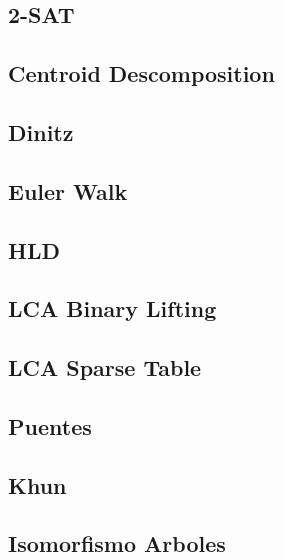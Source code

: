 \subsection{   2-SAT}
\raggedbottom
\hrulefill
\subsection{   Centroid Descomposition}
\raggedbottom
\hrulefill
\subsection{   Dinitz}
\raggedbottom
\hrulefill
\subsection{   Euler Walk}
\raggedbottom
\hrulefill
\subsection{   HLD}
\raggedbottom
\hrulefill
\subsection{   LCA Binary Lifting}
\raggedbottom
\hrulefill
\subsection{   LCA Sparse Table}
\raggedbottom
\hrulefill
\subsection{   Puentes}
\raggedbottom
\hrulefill
\subsection{   Khun}
\raggedbottom
\hrulefill
\subsection{   Isomorfismo Arboles}
\raggedbottom
\hrulefill

